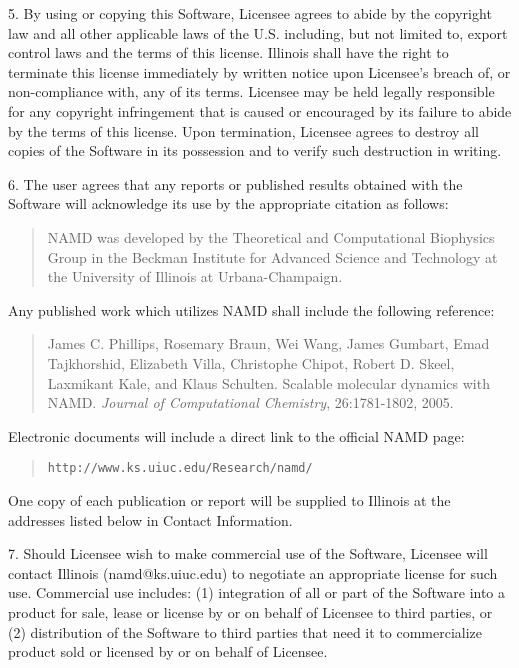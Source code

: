 5. By using or copying this Software, Licensee agrees to abide by the
copyright law and all other applicable laws of the U.S. including, but 
not limited to, export control laws and the terms of this license. 
Illinois shall have the right to terminate this license immediately by 
written notice upon Licensee's breach of, or non-compliance with, any 
of its terms. Licensee may be held legally responsible for any copyright 
infringement that is caused or encouraged by its failure to abide by 
the terms of this license. Upon termination, Licensee agrees to destroy 
all copies of the Software in its possession and to verify such 
destruction in writing.

6. The user agrees that any reports or published results obtained 
with the Software will acknowledge its use by the appropriate citation 
as follows: 

\begin{quote}
 NAMD was developed by the Theoretical and Computational Biophysics Group in the 
 Beckman Institute for Advanced Science and Technology at the 
 University of Illinois at Urbana-Champaign.
\end{quote}

Any published work which utilizes NAMD shall include the following reference: 

\begin{quote}
 James C. Phillips, Rosemary Braun, Wei Wang, James Gumbart,
 Emad Tajkhorshid, Elizabeth Villa, Christophe Chipot, Robert D. Skeel,
 Laxmikant Kale, and Klaus Schulten. Scalable molecular dynamics with NAMD.
 {\it Journal of Computational Chemistry}, 26:1781-1802, 2005.
\end{quote}

Electronic documents will include a direct link to the official NAMD page:

\begin{quote}
{\tt http://www.ks.uiuc.edu/Research/namd/}
\end{quote}

One copy of each publication or report will be supplied to Illinois 
at the addresses listed below in Contact Information.

7. Should Licensee wish to make commercial use of the Software, Licensee 
will contact Illinois (namd@ks.uiuc.edu) to negotiate an appropriate 
license for such use. Commercial use includes: (1) integration of all 
or part of the Software into a product for sale, lease or license by or 
on behalf of Licensee to third parties, or (2) distribution of the 
Software to third parties that need it to commercialize product sold or 
licensed by or on behalf of Licensee.

